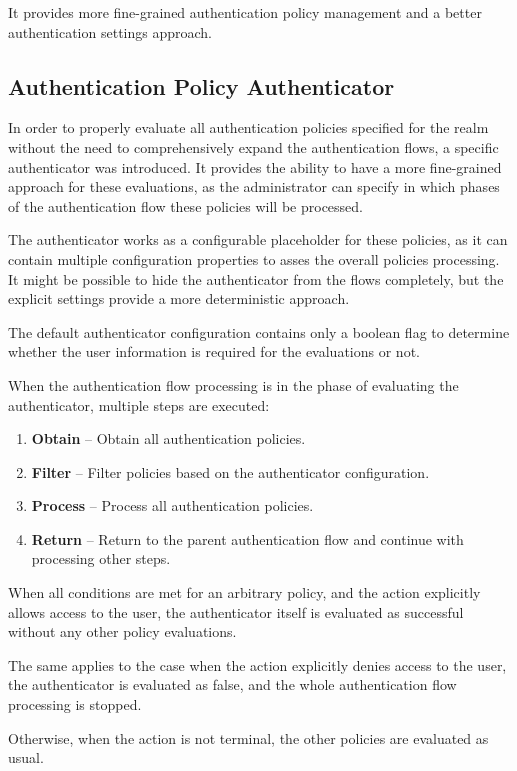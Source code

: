 It provides more fine-grained authentication policy management and a better authentication settings approach.

\subsection{Authentication Policy Authenticator}
In order to properly evaluate all authentication policies specified for the realm without the need to comprehensively expand the authentication flows, a specific authenticator was introduced.
It provides the ability to have a more fine-grained approach for these evaluations, as the administrator can specify in which phases of the authentication flow these policies will be processed.

The authenticator works as a configurable placeholder for these policies, as it can contain multiple configuration properties to asses the overall policies processing.
It might be possible to hide the authenticator from the flows completely, but the explicit settings provide a more deterministic approach.

The default authenticator configuration contains only a boolean flag to determine whether the user information is required for the evaluations or not.

When the authentication flow processing is in the phase of evaluating the authenticator, multiple steps are executed:

\begin{enumerate}
    \item \textbf{Obtain} -- Obtain all authentication policies.
    \item \textbf{Filter} -- Filter policies based on the authenticator configuration.
    \item \textbf{Process} -- Process all authentication policies.
    \item \textbf{Return} -- Return to the parent authentication flow and continue with processing other steps.
\end{enumerate}

When all conditions are met for an arbitrary policy, and the action explicitly allows access to the user, the authenticator itself is evaluated as successful without any other policy evaluations.

The same applies to the case when the action explicitly denies access to the user, the authenticator is evaluated as false, and the whole authentication flow processing is stopped.

Otherwise, when the action is not terminal, the other policies are evaluated as usual.

